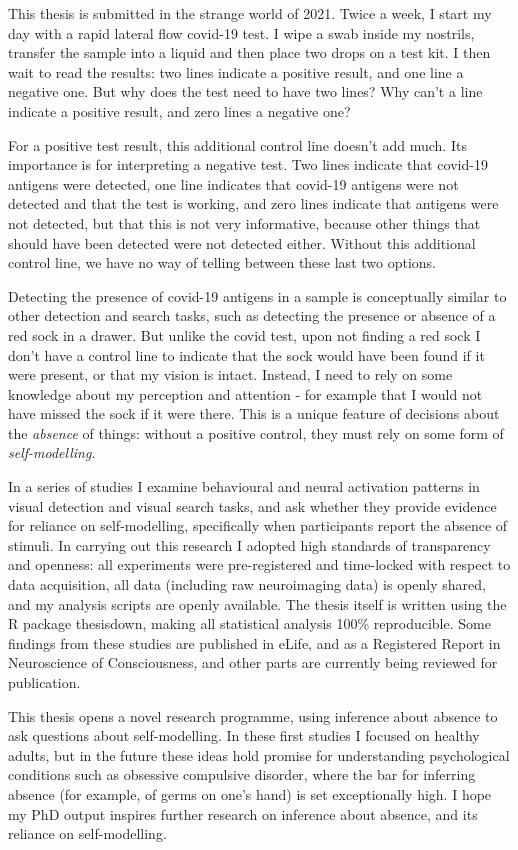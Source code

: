 \documentclass[12pt,twoside]{reedthesis}
\begin{document}
  \begin{impact}
    This thesis is submitted in the strange world of 2021. Twice a week, I start my day with a rapid lateral flow covid-19 test. I wipe a swab inside my nostrils, transfer the sample into a liquid and then place two drops on a test kit. I then wait to read the results: two lines indicate a positive result, and one line a negative one. But why does the test need to have two lines? Why can't a line indicate a positive result, and zero lines a negative one?
    
    For a positive test result, this additional control line doesn't add much. Its importance is for interpreting a negative test. Two lines indicate that covid-19 antigens were detected, one line indicates that covid-19 antigens were not detected and that the test is working, and zero lines indicate that antigens were not detected, but that this is not very informative, because other things that should have been detected were not detected either. Without this additional control line, we have no way of telling between these last two options.
    
    Detecting the presence of covid-19 antigens in a sample is conceptually similar to other detection and search tasks, such as detecting the presence or absence of a red sock in a drawer. But unlike the covid test, upon not finding a red sock I don't have a control line to indicate that the sock would have been found if it were present, or that my vision is intact. Instead, I need to rely on some knowledge about my perception and attention - for example that I would not have missed the sock if it were there. This is a unique feature of decisions about the \emph{absence} of things: without a positive control, they must rely on some form of \emph{self-modelling}.
    
    In a series of studies I examine behavioural and neural activation patterns in visual detection and visual search tasks, and ask whether they provide evidence for reliance on self-modelling, specifically when participants report the absence of stimuli. In carrying out this research I adopted high standards of transparency and openness: all experiments were pre-registered and time-locked with respect to data acquisition, all data (including raw neuroimaging data) is openly shared, and my analysis scripts are openly available. The thesis itself is written using the R package thesisdown, making all statistical analysis 100\% reproducible. Some findings from these studies are published in eLife, and as a Registered Report in Neuroscience of Consciousness, and other parts are currently being reviewed for publication.
    
    This thesis opens a novel research programme, using inference about absence to ask questions about self-modelling. In these first studies I focused on healthy adults, but in the future these ideas hold promise for understanding psychological conditions such as obsessive compulsive disorder, where the bar for inferring absence (for example, of germs on one's hand) is set exceptionally high. I hope my PhD output inspires further research on inference about absence, and its reliance on self-modelling.
  \end{impact}
\end{document}
